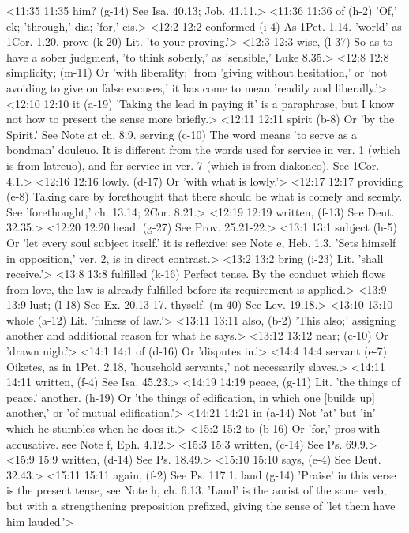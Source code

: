 <11:35 11:35  him? (g-14)  See Isa. 40.13; Job. 41.11.>
<11:36 11:36  of (h-2)  'Of,' ek; 'through,' dia; 'for,' eis.>
<12:2 12:2  conformed (i-4)  As 1Pet. 1.14. 'world' as 1Cor. 1.20.
  prove (k-20)  Lit. 'to your proving.'>
<12:3 12:3  wise, (l-37)  So as to have a sober judgment, 'to think soberly,' as  'sensible,' Luke 8.35.>
<12:8 12:8  simplicity; (m-11)  Or 'with liberality;' from 'giving without hesitation,' or  'not avoiding to give on false excuses,' it has come to mean  'readily and liberally.'>
<12:10 12:10  it (a-19)  'Taking the lead in paying it' is a paraphrase, but I know  not how to present the sense more briefly.>
<12:11 12:11  spirit (b-8)  Or 'by the Spirit.' See Note at ch. 8.9.
  serving (c-10)  The word means 'to serve as a bondman' douleuo. It is  different from the words used for service in ver. 1 (which is  from latreuo), and for service in ver. 7 (which is from  diakoneo). See 1Cor. 4.1.>
<12:16 12:16  lowly. (d-17)  Or 'with what is lowly.'>
<12:17 12:17  providing (e-8)  Taking care by forethought that there should be what is  comely and seemly. See 'forethought,' ch. 13.14; 2Cor. 8.21.>
<12:19 12:19  written, (f-13)  See Deut. 32.35.>
<12:20 12:20  head. (g-27)  See Prov. 25.21-22.>
<13:1 13:1  subject (h-5)  Or 'let every soul subject itself.' it is reflexive; see Note  e, Heb. 1.3. 'Sets himself in opposition,' ver. 2, is in direct  contrast.>
<13:2 13:2  bring (i-23)  Lit. 'shall receive.'>
<13:8 13:8  fulfilled (k-16)  Perfect tense. By the conduct which flows from love, the law  is already fulfilled before its requirement is applied.>
<13:9 13:9  lust; (l-18)  See Ex. 20.13-17.
  thyself. (m-40)  See Lev. 19.18.>
<13:10 13:10  whole (a-12)  Lit. 'fulness of law.'>
<13:11 13:11  also, (b-2)  'This also;' assigning another and additional reason for what  he says.>
<13:12 13:12  near; (c-10)  Or 'drawn nigh.'>
<14:1 14:1  of (d-16)  Or 'disputes in.'>
<14:4 14:4  servant (e-7)  Oiketes, as in 1Pet. 2.18, 'household servants,' not  necessarily slaves.>
<14:11 14:11  written, (f-4)  See Isa. 45.23.>
<14:19 14:19  peace, (g-11)  Lit. 'the things of peace.'
  another. (h-19)  Or 'the things of edification, in which one [builds up]  another,' or 'of mutual edification.'>
<14:21 14:21  in (a-14)  Not 'at' but 'in' which he stumbles when he does it.>
<15:2 15:2  to (b-16)  Or 'for,' pros with accusative. see Note f, Eph. 4.12.>
<15:3 15:3  written, (c-14)  See Ps. 69.9.>
<15:9 15:9  written, (d-14)  See Ps. 18.49.>
<15:10 15:10  says, (e-4)  See Deut. 32.43.>
<15:11 15:11  again, (f-2)  See Ps. 117.1.
  laud (g-14)  'Praise' in this verse is the present tense, see Note h, ch.  6.13. 'Laud' is the aorist of the same verb, but with a  strengthening preposition prefixed, giving the sense of 'let  them have him lauded.'>
